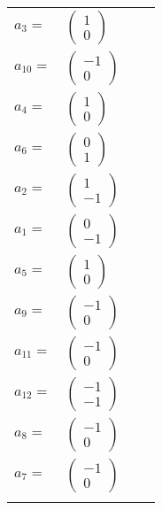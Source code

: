 \documentclass[1p]{elsarticle_modified}
\theoremstyle{definition}
\begin{document}
\begin{tabular}{m{7pt} m{180pt} m{7pt} m{180pt} }
\flushright $a_{3}=$&$\begin{pmatrix}1\\0\end{pmatrix}$ \\
\flushright $a_{10}=$&$\begin{pmatrix}-1\\0\end{pmatrix}$ \\
\flushright $a_{4}=$&$\begin{pmatrix}1\\0\end{pmatrix}$ \\
\flushright $a_{6}=$&$\begin{pmatrix}0\\1\end{pmatrix}$ \\
\flushright $a_{2}=$&$\begin{pmatrix}1\\-1\end{pmatrix}$ \\
\flushright $a_{1}=$&$\begin{pmatrix}0\\-1\end{pmatrix}$ \\
\flushright $a_{5}=$&$\begin{pmatrix}1\\0\end{pmatrix}$ \\
\flushright $a_{9}=$&$\begin{pmatrix}-1\\0\end{pmatrix}$ \\
\flushright $a_{11}=$&$\begin{pmatrix}-1\\0\end{pmatrix}$ \\
\flushright $a_{12}=$&$\begin{pmatrix}-1\\-1\end{pmatrix}$ \\
\flushright $a_{8}=$&$\begin{pmatrix}-1\\0\end{pmatrix}$ \\
\flushright $a_{7}=$&$\begin{pmatrix}-1\\0\end{pmatrix}$\\&\end{tabular}
\end{document}

